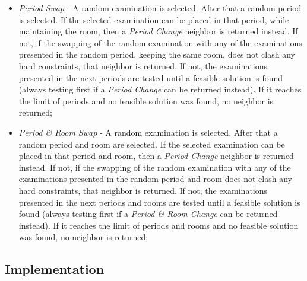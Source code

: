 \begin{itemize}
	\item \textit{Period Swap} -  A random examination is selected. After that a random period is selected. If the selected examination can be placed in that period, while maintaining the room, then a \textit{Period Change} neighbor is returned instead. If not, if the swapping of the random examination with any of the examinations presented in the random period, keeping the same room, does not clash any hard constraints, that neighbor is returned. If not, the examinations presented in the next periods are tested until a feasible solution is found (always testing first if a \textit{Period Change} can be returned instead). If it reaches the limit of periods and no feasible solution was found, no neighbor is returned;\\
	
	\item \textit{Period \& Room Swap} - A random examination is selected. After that a random period and room are selected. If the selected examination can be placed in that period and room, then a \textit{Period Change} neighbor is returned instead. If not, if the swapping of the random examination with any of the examinations presented in the random period and room does not clash any hard constraints, that neighbor is returned. If not, the examinations presented in the next periods and rooms are tested until a feasible solution is found (always testing first if a \textit{Period \& Room Change} can be returned instead). If it reaches the limit of periods and rooms and no feasible solution was found, no neighbor is returned;
\end{itemize}

\subsection{Implementation}

